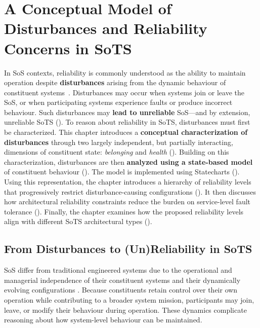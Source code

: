 \chapter{A Conceptual Model of Disturbances and Reliability Concerns in SoTS}
\label{ch:reliable-sots}
In SoS contexts, reliability is commonly understood as the ability to maintain operation despite \textbf{disturbances} arising from the dynamic behaviour of constituent systems~\cite{ferreira2023towards}. Disturbances may occur when systems join or leave the SoS, or when participating systems experience faults or produce incorrect behaviour. Such disturbances may \textbf{lead to unreliable} SoS---and by extension, unreliable SoTS (). To reason about reliability in SoTS, disturbances must first be characterized. This chapter introduces a \textbf{conceptual characterization of disturbances} through two largely independent, but partially interacting, dimensions of constituent state: \emph{belonging} and \emph{health} (). Building on this characterization, disturbances are then \textbf{analyzed using a state-based model} of constituent behaviour (). The model is implemented using Statecharts \cite{harel1987statecharts} (). Using this representation, the chapter introduces a hierarchy of reliability levels that progressively restrict disturbance-causing configurations (). It then discusses how architectural reliability constraints reduce the burden on service-level fault tolerance (). Finally, the chapter examines how the proposed reliability levels align with different SoTS architectural types ().

\section{From Disturbances to (Un)Reliability in SoTS}\label{sec:disturbances-to-unreliability}

SoS differ from traditional engineered systems due to the operational and managerial independence of their constituent systems and their dynamically evolving configurations \cite{maier1998architecting}. Because constituents retain control over their own operation while contributing to a broader system mission, participants may join, leave, or modify their behaviour during operation. These dynamics complicate reasoning about how system-level behaviour can be maintained.

